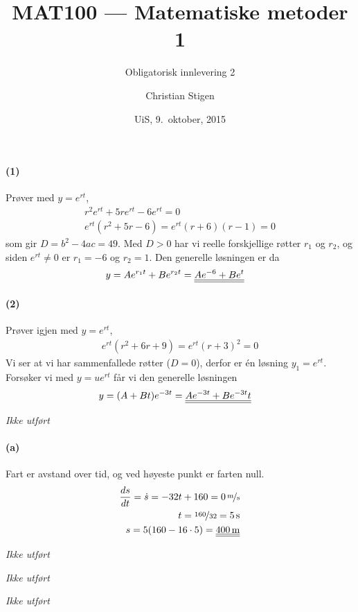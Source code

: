 \documentclass[a4paper,norsk,12pt]{article}
\title{MAT100 --- Matematiske metoder 1}
\subtitle{Obligatorisk innlevering 2}
\author{Christian Stigen}
\date{UiS, 9.~oktober, 2015}
\begin{document}
\maketitle

\paragraph{(1)} Prøver med $y=e^{rt}$,
\begin{equation*}
  \begin{split}
    r^2e^{rt} + 5re^{rt} - 6e^{rt} = 0 \\
    e^{rt}(r^2+5r-6) = e^{rt}(r+6)(r-1) = 0
  \end{split}
\end{equation*}
%
som gir $D = b^2 - 4ac = 49$. Med $D > 0$ har vi reelle forskjellige røtter
$r_1$ og $r_2$, og siden $e^{rt} \neq 0$ er $r_1=-6$ og $r_2=1$. Den generelle
løsningen er da
%
\begin{equation*}
  \begin{split}
    y & = Ae^{r_1t} + Be^{r_2t} = {\underline{\underline{Ae^{-6} + Be^t}}}
  \end{split}
\end{equation*}

\paragraph{(2)} Prøver igjen med $y=e^{rt}$,
\begin{equation*}
  \begin{split}
    e^{rt}(r^2 + 6r + 9) = e^{rt}(r+3)^2 = 0
  \end{split}
\end{equation*}
Vi ser at vi har sammenfallede røtter ($D=0$), derfor er én løsning $y_1 =
e^{rt}$. Forsøker vi med $y = ue^{rt}$ får vi den generelle løsningen
\begin{equation*}
  \begin{split}
    y & = (A + Bt)e^{-3t} = {\underline{\underline{Ae^{-3t} + Be^{-3t}t}}}
  \end{split}
\end{equation*}

\textit{Ikke utført}

\paragraph{(a)}
Fart er avstand over tid, og ved høyeste punkt er farten null.
\begin{equation*}
  \begin{split}
    \frac{ds}{dt} = \dot{s} = -32t + 160 = \unitfrac[0]{m}{s} \\
    t = \nicefrac{160}{32} = \unit[5]{s} \\
    s = 5(160-16\cdot5) = \svar{\unit[400]{m}}
  \end{split}
\end{equation*}

\textit{Ikke utført}

\textit{Ikke utført}

\textit{Ikke utført}
\end{document}
